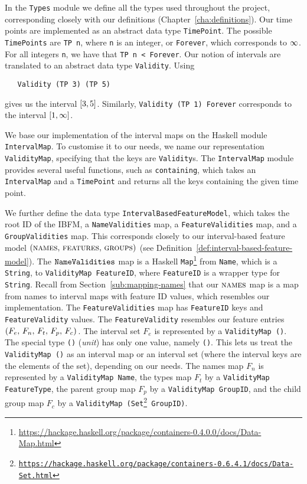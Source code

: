 In the \texttt{Types} module we define all the types used throughout the project, corresponding closely with our definitions (Chapter~\vref{cha:definitions}). Our time points are implemented as an abstract data type \texttt{TimePoint}. The possible \texttt{TimePoints} are \texttt{TP n}, where \texttt{n} is an integer, or \texttt{Forever}, which corresponds to $\infty$. For all integers \texttt{n}, we have that \texttt{TP n < Forever}. Our notion of intervals are translated to an abstract data type \texttt{Validity}. Using
\begin{verbatim}
   Validity (TP 3) (TP 5)
\end{verbatim}
gives us the interval $\interval{3}{5}$. Similarly, \texttt{Validity (TP 1) Forever} corresponds to the interval $\interval{1}{\forever}$. 

We base our implementation of the interval maps on the Haskell module \texttt{Interval\-Map}. To customise it to our needs, we name our representation \texttt{Validity\-Map}, specifying that the keys are \texttt{Validity}s. The \texttt{IntervalMap} module provides several useful functions, such as \texttt{containing}, which takes an \texttt{Interval\-Map} and a \texttt{Time\-Point} and returns all the keys containing the given time point.

We further define the data type \texttt{Interval\-Based\-Feature\-Model}, which takes the root ID of the IBFM, a \texttt{Name\-Validities} map, a \texttt{Feature\-Validities} map, and a \texttt{Group\-Validities} map. This corresponds closely to our interval-based feature model  $(\nobreak \textsc{names},\,\textsc{features},\, \textsc{groups}{})$ (see Definition~\vref{def:interval-based-feature-model}). The $\texttt{Name\-Validities}$ map is a Haskell \texttt{Map}\footnote{\url{https://hackage.haskell.org/package/containers-0.4.0.0/docs/Data-Map.html}} from \texttt{Name}, which is a \texttt{String}, to \texttt{Validity\-Map FeatureID}, where \texttt{FeatureID} is a wrapper type for \texttt{String}. Recall from Section~\vref{sub:mapping-names} that our $\textsc{names}{}$ map is a map from names to interval maps with feature ID values, which resembles our implementation. The \texttt{Feature\-Validities} map has \texttt{Feature\-ID} keys and \texttt{Feature\-Validity} values. The \texttt{Feature\-Validity} resembles our feature entries $\left(F_e,\, F_n,\, F_t,\, F_p,\, F_c\right){}$. The interval set $F_e$ is represented by a \texttt{Validity\-Map ()}. The special type \texttt{()} (\emph{unit}) has only one value, namely \texttt{()}. This lets us treat the \texttt{Validity\-Map ()} as an interval map or an interval set (where the interval keys are the elements of the set), depending on our needs. The names map $F_n$ is represented by a \texttt{Validity\-Map Name}, the types map $F_t$ by a \texttt{Validity\-Map Feature\-Type}, the parent group map $F_p$ by a \texttt{Validity\-Map Group\-ID}, and the child group map $F_c$ by a \texttt{Validity\-Map (Set\footnote{\url{https://hackage.haskell.org/package/containers-0.6.4.1/docs/Data-Set.html}} Group\-ID)}.

